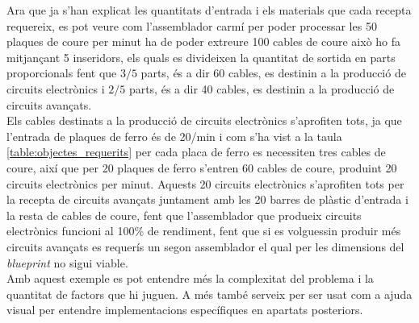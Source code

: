Ara que ja s'han explicat les quantitats d'entrada i els materials que cada recepta requereix, es pot veure com l'assemblador carmí per poder processar les 50 plaques de coure per minut ha de poder extreure 100 cables de coure això ho fa mitjançant 5 inseridors, els quals es divideixen la quantitat de sortida en parts proporcionals fent que $3/5$ parts, és a dir 60 cables, es destinin a la producció de circuits electrònics i $2/5$ parts, és a dir 40 cables, es destinin a la producció de circuits avançats.\\
Els cables destinats a la producció de circuits electrònics s'aprofiten tots, ja que l'entrada de plaques de ferro és de 20/min i com s'ha vist a la taula \ref{table:objectes_requerits} per cada placa de ferro es necessiten tres cables de coure, així que per 20 plaques de ferro s'entren 60 cables de coure, produint 20 circuits electrònics per minut. Aquests 20 circuits electrònics s'aprofiten tots per la recepta de circuits avançats juntament amb les 20 barres de plàstic d'entrada i la resta de cables de coure, fent que l'assemblador que produeix circuits electrònics funcioni al 100\% de rendiment, fent que si es volguessin produir més circuits avançats es requerís un segon assemblador el qual per les dimensions del \textit{blueprint} no sigui viable.\\

Amb aquest exemple es pot entendre més la complexitat del problema i la quantitat de factors que hi juguen. A més també serveix per ser usat com a ajuda visual per entendre implementacions específiques en apartats posteriors.


